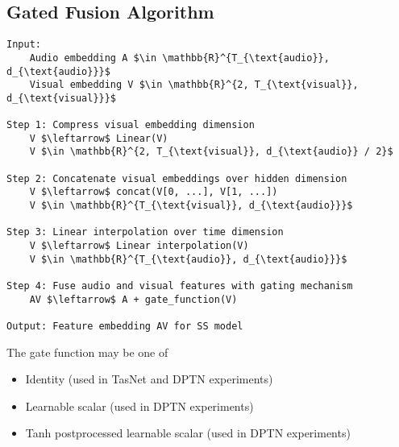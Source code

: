 \documentclass[10pt,conference,compsocconf]{IEEEtran}
\begin{document}
\onecolumn
\appendix


\subsection{Gated Fusion Algorithm}\label{sec:fusion}
\begin{lstlisting}[mathescape=true]
Input:
    Audio embedding A $\in \mathbb{R}^{T_{\text{audio}}, d_{\text{audio}}}$
    Visual embedding V $\in \mathbb{R}^{2, T_{\text{visual}}, d_{\text{visual}}}$

Step 1: Compress visual embedding dimension
    V $\leftarrow$ Linear(V)
    V $\in \mathbb{R}^{2, T_{\text{visual}}, d_{\text{audio}} / 2}$

Step 2: Concatenate visual embeddings over hidden dimension
    V $\leftarrow$ concat(V[0, ...], V[1, ...])
    V $\in \mathbb{R}^{T_{\text{visual}}, d_{\text{audio}}}$
 
Step 3: Linear interpolation over time dimension
    V $\leftarrow$ Linear interpolation(V)
    V $\in \mathbb{R}^{T_{\text{audio}}, d_{\text{audio}}}$

Step 4: Fuse audio and visual features with gating mechanism
    AV $\leftarrow$ A + gate_function(V)

Output: Feature embedding AV for SS model
\end{lstlisting}

The gate function may be one of 
\begin{itemize}
    \item Identity (used in TasNet and DPTN experiments)
    \item Learnable scalar (used in DPTN experiments)
    \item Tanh postprocessed learnable scalar (used in DPTN experiments)
\end{itemize}
\end{document}
